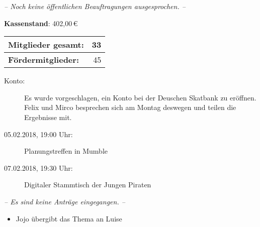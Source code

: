 \begin{Protokoll}
    \emph{-- Noch keine öffentlichen Beauftragungen ausgesprochen. --}
    
    \textbf{Kassenstand}: 402,00\,\euro
    
    \begin{center}
        \begin{tabular}{|l||r|}
            \hline
            \textbf{Mitglieder gesamt:}             &   33\\
            \hline
            \textbf{Fördermitglieder:}                & 45 \\                
            \hline
            \hline
        \end{tabular}
    \end{center}
    
    
    \begin{description}
        \item[Konto:] Es wurde vorgeschlagen, ein Konto bei der Deuschen Skatbank zu eröffnen. Felix und Mirco besprechen sich am Montag deswegen und teilen die Ergebnisse mit.
    \end{description}
    
    \begin{description}
         \item[05.02.2018, 19:00 Uhr: ] Planungstreffen in Mumble
        \item[07.02.2018, 19:30 Uhr:] Digitaler Stammtisch der Jungen Piraten
    \end{description}
    
    \emph{-- Es sind keine Anträge eingegangen. --}
  
    \begin{itemize}
        \item Jojo übergibt das Thema an Luise
    \end{itemize}
    

\end{Protokoll}
